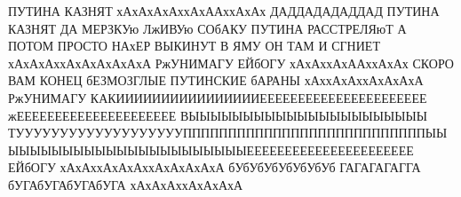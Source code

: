  
 
 
 
 

ПУТИНА КАЗНЯТ хАхАхАхАххАхААххАхАх ДАДДАДАДАДДАД ПУТИНА КАЗНЯТ ДА МЕРЗКУю ЛжИВУю СОбАКУ
ПУТИНА РАССТРЕЛЯюТ А ПОТОМ ПРОСТО НАхЕР ВЫКИНУТ В ЯМУ ОН ТАМ И СГНИЕТ хАхАхАххАхАхАхАхАхА
РжУНИМАГУ ЕЙбОГУ хАхАххАхААххАхАх СКОРО ВАМ КОНЕЦ бЕЗМОЗГЛЫЕ ПУТИНСКИЕ бАРАНЫ хАххАхАххАхАхАхА
РжУНИМАГУ КАКИИИИИИИИИИИИИИИИЕЕЕЕЕЕЕЕЕЕЕЕЕЕЕЕЕЕЕЕЕЕ жЕЕЕЕЕЕЕЕЕЕЕЕЕЕЕЕЕЕЕЕЕ ВЫЫЫЫЫЫЫЫЫЫЫЫЫЫЫЫЫЫЫЫЫЫ
ТУУУУУУУУУУУУУУУУУУУПППППППППППППППППППППППППППЫЫЫЫЫЫЫЫЫЫЫЫЫЫЫЫЫЫЫЫЫЫЫЫЕЕЕЕЕЕЕЕЕЕЕЕЕЕЕЕЕЕЕЕЕЕ
ЕЙбОГУ хАхАххАхАхАххАхАхАхАхА бУбУбУбУбУбУбУб ГАГАГАГАГГА бУГАбУГАбУГАбУГА хАхАхАххАхАхАхА

